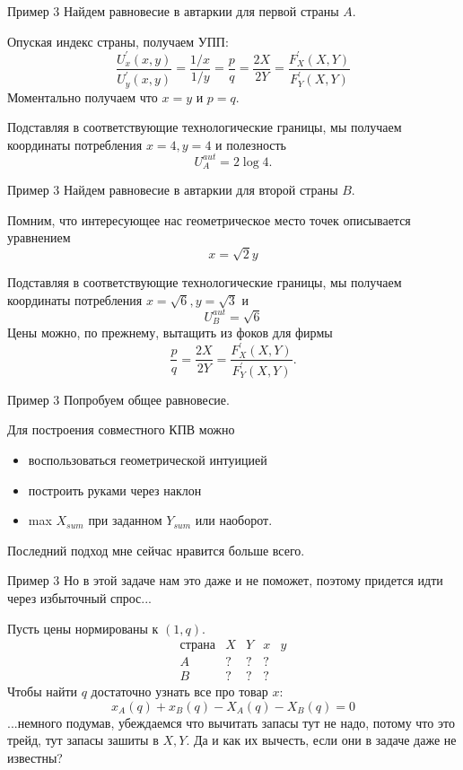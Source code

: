 \documentclass{beamer}
\begin{document}
\begin{frame}{Пример 3}
Найдем равновесие в автаркии для первой страны $A$. 

Опуская индекс страны, получаем УПП:
$$ \frac{U^{'}_x(x,y)}{U^{'}_y(x,y)} = \frac{1/x}{1/y} = \frac{p}{q} = \frac{2X}{2Y} = \frac{F^{'}_X(X,Y)}{F^{'}_Y(X,Y)}$$
Моментально получаем что $x = y$ и $p = q$.

Подставляя в соответствующие технологические границы, мы получаем координаты потребления $x = 4, y = 4$ и полезность $$U^{aut}_A = 2 \log 4.$$

\end{frame}

\begin{frame}{Пример 3}
Найдем равновесие в автаркии для второй страны $B$. 

Помним, что интересующее нас геометрическое место точек описывается уравнением
$$x = \sqrt{2} y$$

Подставляя в соответствующие технологические границы, мы получаем координаты потребления $x = \sqrt{6}, y = \sqrt{3}$ и $$U^{aut}_B = \sqrt{6}$$
Цены можно, по прежнему, вытащить из фоков для фирмы
$$ \frac{p}{q} = \frac{2X}{2Y} = \frac{F^{'}_X(X,Y)}{F^{'}_Y(X,Y)}.$$
\end{frame}

\begin{frame}{Пример 3}
Попробуем общее равновесие.

Для построения совместного КПВ можно
\begin{itemize}
  \item воспользоваться геометрической интуицией
  \item построить руками через наклон
  \item max $X_{sum}$ при заданном $Y_{sum}$ или наоборот.
\end{itemize}
Последний подход мне сейчас нравится больше всего.
\end{frame}

\begin{frame}{Пример 3}
Но в этой задаче нам это даже и не поможет, поэтому придется идти через избыточный спрос...

Пусть цены нормированы к $(1,q)$.
$$\begin{array}{c|c|c|c|c}
  \text{страна} & X & Y & x & y \\
  \hline
  A & ? & ? & ? &\\
  \hline
  B & ? & ? & ? &
\end{array}$$
Чтобы найти $q$ достаточно узнать все про товар $x$:
$$ x_A(q) + x_B(q) - X_A(q) - X_B(q) = 0$$
...немного подумав, убеждаемся что \alert{вычитать запасы тут не надо, потому что это трейд, тут запасы зашиты в $X,Y$}. Да и как их вычесть, если они в задаче даже не известны?
\end{frame}
\end{document}
